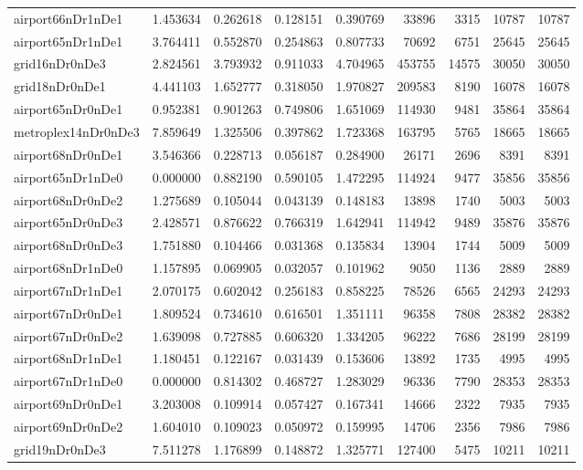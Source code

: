 \begin{longtable}{|l|r|r|r|r|r|r|r|r|}
airport66nDr1nDe1 & 1.453634 & 0.262618 & 0.128151 & 0.390769 & 33896 & 3315 & 10787 & 10787 \\
airport65nDr1nDe1 & 3.764411 & 0.552870 & 0.254863 & 0.807733 & 70692 & 6751 & 25645 & 25645 \\
grid16nDr0nDe3 & 2.824561 & 3.793932 & 0.911033 & 4.704965 & 453755 & 14575 & 30050 & 30050 \\
grid18nDr0nDe1 & 4.441103 & 1.652777 & 0.318050 & 1.970827 & 209583 & 8190 & 16078 & 16078 \\
airport65nDr0nDe1 & 0.952381 & 0.901263 & 0.749806 & 1.651069 & 114930 & 9481 & 35864 & 35864 \\
metroplex14nDr0nDe3 & 7.859649 & 1.325506 & 0.397862 & 1.723368 & 163795 & 5765 & 18665 & 18665 \\
airport68nDr0nDe1 & 3.546366 & 0.228713 & 0.056187 & 0.284900 & 26171 & 2696 & 8391 & 8391 \\
airport65nDr1nDe0 & 0.000000 & 0.882190 & 0.590105 & 1.472295 & 114924 & 9477 & 35856 & 35856 \\
airport68nDr0nDe2 & 1.275689 & 0.105044 & 0.043139 & 0.148183 & 13898 & 1740 & 5003 & 5003 \\
airport65nDr0nDe3 & 2.428571 & 0.876622 & 0.766319 & 1.642941 & 114942 & 9489 & 35876 & 35876 \\
airport68nDr0nDe3 & 1.751880 & 0.104466 & 0.031368 & 0.135834 & 13904 & 1744 & 5009 & 5009 \\
airport68nDr1nDe0 & 1.157895 & 0.069905 & 0.032057 & 0.101962 & 9050 & 1136 & 2889 & 2889 \\
airport67nDr1nDe1 & 2.070175 & 0.602042 & 0.256183 & 0.858225 & 78526 & 6565 & 24293 & 24293 \\
airport67nDr0nDe1 & 1.809524 & 0.734610 & 0.616501 & 1.351111 & 96358 & 7808 & 28382 & 28382 \\
airport67nDr0nDe2 & 1.639098 & 0.727885 & 0.606320 & 1.334205 & 96222 & 7686 & 28199 & 28199 \\
airport68nDr1nDe1 & 1.180451 & 0.122167 & 0.031439 & 0.153606 & 13892 & 1735 & 4995 & 4995 \\
airport67nDr1nDe0 & 0.000000 & 0.814302 & 0.468727 & 1.283029 & 96336 & 7790 & 28353 & 28353 \\
airport69nDr0nDe1 & 3.203008 & 0.109914 & 0.057427 & 0.167341 & 14666 & 2322 & 7935 & 7935 \\
airport69nDr0nDe2 & 1.604010 & 0.109023 & 0.050972 & 0.159995 & 14706 & 2356 & 7986 & 7986 \\
grid19nDr0nDe3 & 7.511278 & 1.176899 & 0.148872 & 1.325771 & 127400 & 5475 & 10211 & 10211 \\

\end{longtable}
